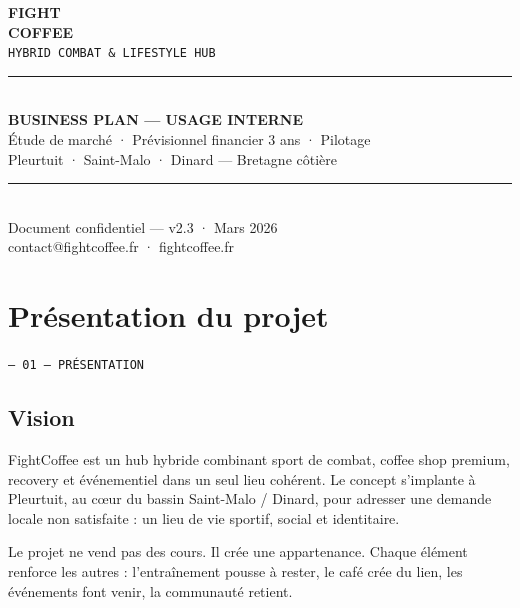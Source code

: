 \documentclass[11pt, a4paper]{article}
\newcommand{\eyebrow}[1]{%
  \vspace{4pt}
  {\small\color{fc-ink3}\texttt{— #1}}
  \vspace{2pt}
}
\begin{document}
\thispagestyle{empty}
\vspace*{3cm}
\begin{center}
  {\fontsize{48}{52}\selectfont\bfseries\color{fc-ink} FIGHT}\\[2pt]
  {\fontsize{48}{52}\selectfont\bfseries\color{fc-red} COFFEE}\\[12pt]
  {\large\color{fc-ink3}\texttt{HYBRID COMBAT \& LIFESTYLE HUB}}\\[40pt]
  \color{fc-rule}\rule{10cm}{0.6pt}\\[24pt]
  {\Large\bfseries\color{fc-ink} BUSINESS PLAN — USAGE INTERNE}\\[10pt]
  {\normalsize\color{fc-ink2} Étude de marché · Prévisionnel financier 3 ans · Pilotage}\\[6pt]
  {\normalsize\color{fc-ink2} Pleurtuit · Saint-Malo · Dinard — Bretagne côtière}\\[40pt]
  \color{fc-rule}\rule{10cm}{0.6pt}\\[20pt]
  {\small\color{fc-ink3} Document confidentiel — v2.3 · Mars 2026}\\[4pt]
  {\small\color{fc-red} contact@fightcoffee.fr · fightcoffee.fr}
\end{center}

\newpage

\tableofcontents
\newpage

\section{Présentation du projet}
\eyebrow{01 — PRÉSENTATION}

\subsection{Vision}

FightCoffee est un hub hybride combinant sport de combat, coffee shop premium, recovery et événementiel dans un seul lieu cohérent. Le concept s'implante à Pleurtuit, au cœur du bassin Saint-Malo / Dinard, pour adresser une demande locale non satisfaite : un lieu de vie sportif, social et identitaire.

Le projet ne vend pas des cours. Il crée une appartenance. Chaque élément renforce les autres : l'entraînement pousse à rester, le café crée du lien, les événements font venir, la communauté retient.
\end{document}

